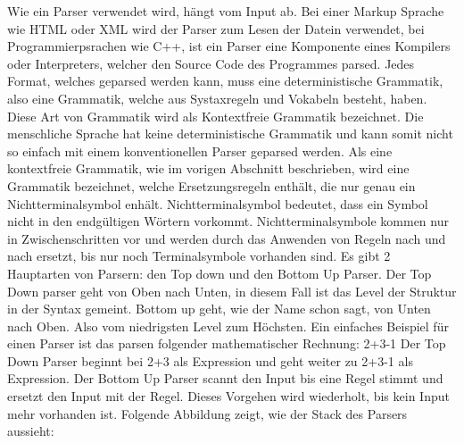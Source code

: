 Wie ein Parser verwendet wird, hängt vom Input ab. Bei einer Markup Sprache wie HTML oder XML wird der Parser zum Lesen der Datein verwendet, bei Programmierpsrachen wie C++, ist ein Parser eine Komponente eines Kompilers oder Interpreters, welcher den Source Code des Programmes parsed.\newline\newline
Jedes Format, welches geparsed werden kann, muss eine deterministische Grammatik, also eine Grammatik, welche aus Systaxregeln und Vokabeln besteht, haben. Diese Art von Grammatik wird als \glqq{} Kontextfreie Grammatik \glqq{} bezeichnet. Die menschliche Sprache hat keine deterministische Grammatik und kann somit nicht so einfach mit einem konventionellen Parser geparsed werden. \autocite[]{Garsiel.}\newline\newline
Als eine kontextfreie Grammatik, wie im vorigen Abschnitt beschrieben, wird eine Grammatik bezeichnet, welche Ersetzungsregeln enthält, die nur genau ein Nichtterminalsymbol enhält. Nichtterminalsymbol bedeutet, dass ein Symbol nicht in den endgültigen Wörtern vorkommt. Nichtterminalsymbole kommen nur in Zwischenschritten vor und werden durch das Anwenden von Regeln nach und nach ersetzt, bis nur noch Terminalsymbole vorhanden sind.\newline\newline
Es gibt 2 Hauptarten von Parsern: den \glqq{}Top down \grqq{} und den \glqq{} Bottom Up \grqq{} Parser. Der Top Down parser geht von Oben nach Unten, in diesem Fall ist das Level der Struktur in der Syntax gemeint. Bottom up geht, wie der Name schon sagt, von Unten nach Oben. Also vom niedrigsten Level zum Höchsten. \newline
Ein einfaches Beispiel für einen Parser ist das parsen folgender mathematischer Rechnung:
2+3-1\newline
Der Top Down Parser beginnt bei 2+3 als Expression und geht weiter zu 2+3-1 als Expression. \newline
Der Bottom Up Parser scannt den Input bis eine Regel stimmt und ersetzt den Input mit der Regel. Dieses Vorgehen wird wiederholt, bis kein Input mehr vorhanden ist. Folgende Abbildung zeigt, wie der Stack des Parsers aussieht:
